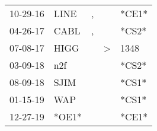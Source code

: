 \begin{supertabular}{p{0.07\textwidth}p{0.06\textwidth}p{0.02\textwidth}p{0.02\textwidth}p{0.06\textwidth}}
 10-29-16\textsuperscript{} &           LINE\textsuperscript{} &             , &               &                            *CE1* \\
 04-26-17\textsuperscript{} &           CABL\textsuperscript{} &             , &               &                            *CS2* \\
 07-08-17\textsuperscript{} &           HIGG\textsuperscript{} &               &  \textgreater &           1348\textsuperscript{} \\
 03-09-18\textsuperscript{} &            n2f\textsuperscript{} &               &               &                            *CS2* \\
 08-09-18\textsuperscript{} &           SJIM\textsuperscript{} &               &               &                            *CS1* \\
 01-15-19\textsuperscript{} &            WAP\textsuperscript{} &               &               &                            *CS1* \\
 12-27-19\textsuperscript{} &                            *OE1* &               &               &                            *CE1* \\
\end{supertabular}
